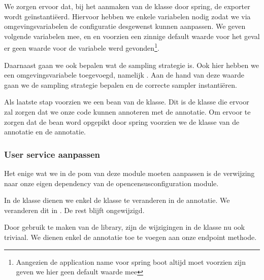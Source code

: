We zorgen ervoor dat, bij het aanmaken van de klasse door spring, de exporter wordt ge\"{i}nstanti\"{e}erd. Hiervoor hebben we enkele variabelen nodig zodat we via omgevingsvariabelen de configuratie desgewenst kunnen aanpassen. We geven volgende variabelen mee,   en  en voorzien een zinnige default waarde voor het geval er geen waarde voor de variabele werd gevonden\footnote{Aangezien de application name voor spring boot altijd moet voorzien zijn geven we hier geen default waarde mee}.

Daarnaast gaan we ook bepalen wat de sampling strategie is. Ook hier hebben we een omgevingsvariabele toegevoegd, namelijk . Aan de hand van deze waarde gaan we de sampling strategie bepalen en de correcte sampler instanti\"{e}ren.

Als laatste stap voorzien we een bean van de  klasse. Dit is de klasse die ervoor zal zorgen dat we onze code kunnen annoteren met de  annotatie. Om ervoor te zorgen dat de bean word opgepikt door spring voorzien we de klasse van de  annotatie en de  annotatie.

\subsubsection{User service aanpassen}
Het enige wat we in de pom van deze module moeten aanpassen is de verwijzing naar onze eigen dependency van de opencensusconfiguration module.

In de  klasse dienen we enkel de klasse te veranderen in de  annotatie. We veranderen dit in . De rest blijft ongewijzigd.

Door gebruik te maken van de  library, zijn de wijzigingen in de  klasse nu ook triviaal. We dienen enkel de annotatie  toe te voegen aan onze endpoint methode.

